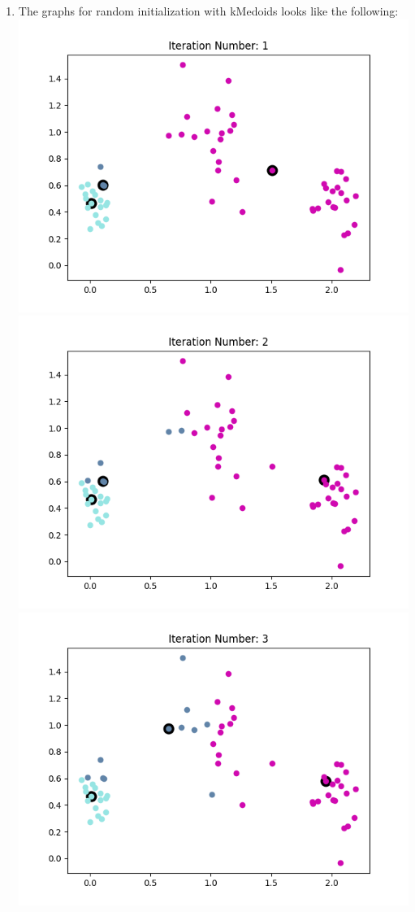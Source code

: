 \documentclass[11pt]{article}
\begin{document}
\begin{enumerate}
\begin{center}
{\begin{tabular}{c | c | c | c}
	\end{tabular}}
\end{center}

\item 
The graphs for random initialization with kMedoids looks like the following: \newline
\includegraphics[scale=0.4]{medoid_1.png}
\includegraphics[scale=0.4]{medoid_2.png} \newline
\includegraphics[scale=0.4]{medoid_3.png}

\end{enumerate}
\end{document}
